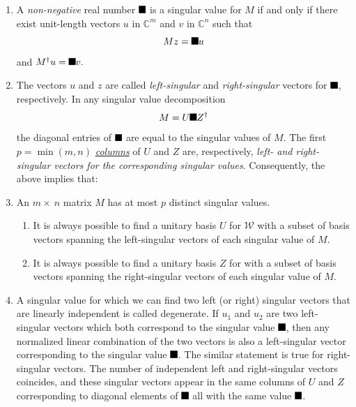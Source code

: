 \documentclass[aps,preprint]{revtex4}%
\providecommand{\U}[1]{\protect\rule{.1in}{.1in}}
\begin{document}
\begin{enumerate}
\item A \emph{non-negative} real number $\U{3c3} $ is a singular value for $M$
if and only if there exist unit-length vectors $u$ in $\mathbb{C}^{m}$ and $v$
in $\mathbb{C}^{n}$ such that%
\begin{equation}
Mz=\U{3c3} u
\end{equation}
and $M^{\dagger}u=\U{3c3} v.$

\item The vectors $u$ and $z$ are called \emph{left-singular} and
\emph{right-singular} vectors for $\U{3c3} $, respectively. In any singular
value decomposition%
\begin{equation}
M=U\U{3a3} Z^{\dagger}%
\end{equation}
the diagonal entries of $\U{3a3} $ are equal to the singular values of $M$.
The first $p=\min(m,n)$ \underline{\emph{columns}} of $U$ and $Z$ are,
respectively, \emph{left- and right-singular vectors for the corresponding
singular values}. Consequently, the above implies that:

\item An $m\times\ n$ matrix $M$ has at most $p$ distinct singular values.

\begin{enumerate}
\item It is always possible to find a unitary basis $U$ for $\mathcal{W}$ with
a subset of basis vectors spanning the left-singular vectors of each singular
value of $M$.

\item It is always possible to find a unitary basis $Z$ for  with a
subset of basis vectors spanning the right-singular vectors of each singular
value of $M$.
\end{enumerate}

\item A singular value for which we can find two left (or right) singular
vectors that are linearly independent is called degenerate. If $u_{1}$ and
$u_{2}$ are two left-singular vectors which both correspond to the singular
value $\U{3c3} $, then any normalized linear combination of the two vectors is
also a left-singular vector corresponding to the singular value $\U{3c3} $.
The similar statement is true for right-singular vectors. The number of
independent left and right-singular vectors coincides, and these singular
vectors appear in the same columns of $U$ and $Z$ corresponding to diagonal
elements of $\U{3a3} $ all with the same value $\U{3c3} $.


\end{enumerate}
\end{document}
